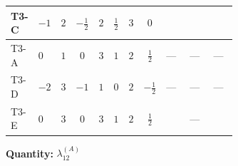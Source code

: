 \documentclass[8pt]{article}
\begin{document}
\begin{landscape}
\begin{longtable}{@{}llcccccc >{\raggedright\arraybackslash}p{0.21\linewidth} >{\raggedright\arraybackslash}p{0.21\linewidth} >{\raggedright\arraybackslash}p{0.21\linewidth}@{}}
\midrule
T3-C & $-1$ & $2$ & $-\frac{1}{2}$ & $2$ & $\frac{1}{2}$ & $3$ & $0$ & \scriptsize\adjustbox{max width=\linewidth}{$\begin{gathered} +\frac{4}{3} {\lambda_5} \left({\lambda_5}\right)^{*}\end{gathered}$} & \scriptsize\adjustbox{max width=\linewidth}{$\begin{gathered} +{g_1}^2 \left(-6 {g_2}^2-3 {\lambda_{12}^{(A)}}\right)\end{gathered}$} & \scriptsize\adjustbox{max width=\linewidth}{$\begin{gathered} -9 {g_2}^2 {\lambda_{12}^{(A)}}\end{gathered}$} \\
\midrule
T3-A & $0$ & $1$ & $0$ & $3$ & $1$ & $2$ & $\frac{1}{2}$ & --- & --- & --- \\
\midrule
T3-D & $-2$ & $3$ & $-1$ & $1$ & $0$ & $2$ & $-\frac{1}{2}$ & --- & --- & --- \\
\midrule
T3-E & $0$ & $3$ & $0$ & $3$ & $1$ & $2$ & $\frac{1}{2}$ & \scriptsize\adjustbox{max width=\linewidth}{$\begin{gathered} -\frac{2}{9} {\lambda_5} \left({\lambda_5}\right)^{*}\end{gathered}$} & --- & \scriptsize\adjustbox{max width=\linewidth}{$\begin{gathered} -24 {g_2}^2 {\lambda_{12}^{(A)}}\end{gathered}$} \\
\midrule
\bottomrule
\end{longtable}
\clearpage
\noindent\textbf{Quantity: }$\lambda_{12}^{(A)}$\par\smallskip

\end{landscape}
\end{document}
